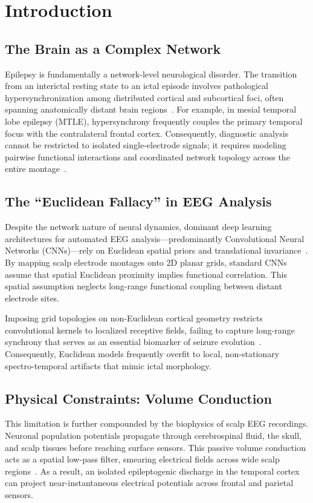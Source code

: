 \documentclass[journal]{IEEEtran}
\begin{document}
\section{Introduction}

\subsection{The Brain as a Complex Network}
Epilepsy is fundamentally a network-level neurological disorder. The transition from an interictal resting state to an ictal episode involves pathological hypersynchronization among distributed cortical and subcortical foci, often spanning anatomically distant brain regions~\cite{bullmore, stam}. For example, in mesial temporal lobe epilepsy (MTLE), hypersynchrony frequently couples the primary temporal focus with the contralateral frontal cortex. Consequently, diagnostic analysis cannot be restricted to isolated single-electrode signals; it requires modeling pairwise functional interactions and coordinated network topology across the entire montage~\cite{stam, bartolomei}.

\subsection{The ``Euclidean Fallacy'' in EEG Analysis}
Despite the network nature of neural dynamics, dominant deep learning architectures for automated EEG analysis—predominantly Convolutional Neural Networks (CNNs)—rely on Euclidean spatial priors and translational invariance~\cite{bronstein}. By mapping scalp electrode montages onto 2D planar grids, standard CNNs assume that spatial Euclidean proximity implies functional correlation. This spatial assumption neglects long-range functional coupling between distant electrode sites.

Imposing grid topologies on non-Euclidean cortical geometry restricts convolutional kernels to localized receptive fields, failing to capture long-range synchrony that serves as an essential biomarker of seizure evolution~\cite{friston}. Consequently, Euclidean models frequently overfit to local, non-stationary spectro-temporal artifacts that mimic ictal morphology.

\subsection{Physical Constraints: Volume Conduction}
This limitation is further compounded by the biophysics of scalp EEG recordings. Neuronal population potentials propagate through cerebrospinal fluid, the skull, and scalp tissues before reaching surface sensors. This passive volume conduction acts as a spatial low-pass filter, smearing electrical fields across wide scalp regions~\cite{nunez}. As a result, an isolated epileptogenic discharge in the temporal cortex can project near-instantaneous electrical potentials across frontal and parietal sensors. 
\end{document}
